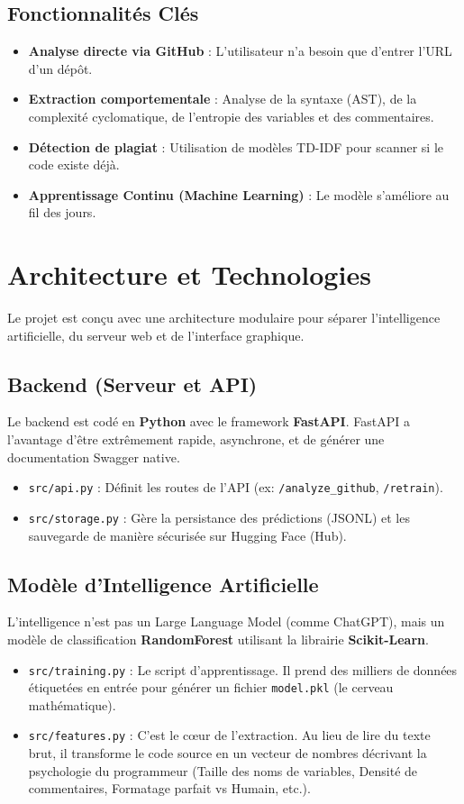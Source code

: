 \documentclass[a4paper,11pt]{article}
\begin{document}
\subsection{Fonctionnalités Clés}
\begin{itemize}
    \item \textbf{Analyse directe via GitHub} : L'utilisateur n'a besoin que d'entrer l'URL d'un dépôt.
    \item \textbf{Extraction comportementale} : Analyse de la syntaxe (AST), de la complexité cyclomatique, de l'entropie des variables et des commentaires.
    \item \textbf{Détection de plagiat} : Utilisation de modèles TD-IDF pour scanner si le code existe déjà.
    \item \textbf{Apprentissage Continu (Machine Learning)} : Le modèle s'améliore au fil des jours.
\end{itemize}

\section{Architecture et Technologies}

Le projet est conçu avec une architecture modulaire pour séparer l'intelligence artificielle, du serveur web et de l'interface graphique.

\subsection{Backend (Serveur et API)}
Le backend est codé en \textbf{Python} avec le framework \textbf{FastAPI}. FastAPI a l'avantage d'être extrêmement rapide, asynchrone, et de générer une documentation Swagger native.
\begin{itemize}
    \item \texttt{src/api.py} : Définit les routes de l'API (ex: \texttt{/analyze\_github}, \texttt{/retrain}).
    \item \texttt{src/storage.py} : Gère la persistance des prédictions (JSONL) et les sauvegarde de manière sécurisée sur Hugging Face (Hub).
\end{itemize}

\subsection{Modèle d'Intelligence Artificielle}
L'intelligence n'est pas un Large Language Model (comme ChatGPT), mais un modèle de classification \textbf{RandomForest} utilisant la librairie \textbf{Scikit-Learn}.
\begin{itemize}
    \item \texttt{src/training.py} : Le script d'apprentissage. Il prend des milliers de données étiquetées en entrée pour générer un fichier \texttt{model.pkl} (le cerveau mathématique).
    \item \texttt{src/features.py} : C'est le cœur de l'extraction. Au lieu de lire du texte brut, il transforme le code source en un vecteur de nombres décrivant la psychologie du programmeur (Taille des noms de variables, Densité de commentaires, Formatage parfait vs Humain, etc.).
\end{itemize}
\end{document}
